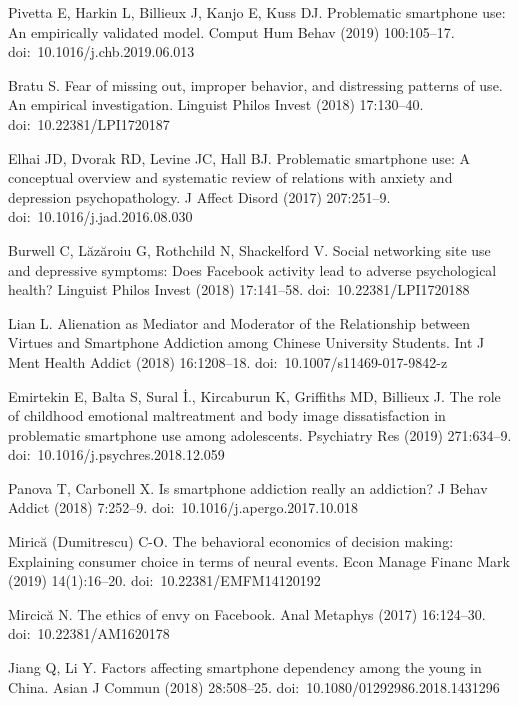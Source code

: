 \documentclass[a4paper]{article}
\begin{document}
\newpage
{}
\appendix

\begin{thebibliography}{10}

 Pivetta E, Harkin L, Billieux J, Kanjo E, Kuss DJ. 
Problematic smartphone use: An empirically validated model.
Comput Hum Behav (2019) 100:105–17. doi: 10.1016/j.chb.2019.06.013

 Bratu S. Fear of missing out, improper behavior,
and distressing patterns of use. An empirical investigation.
Linguist Philos Invest (2018) 17:130–40. doi: 10.22381/LPI1720187

 Elhai JD, Dvorak RD, Levine JC, Hall BJ.
Problematic smartphone use: A conceptual overview and systematic review
of relations with anxiety and depression psychopathology.
J Affect Disord (2017) 207:251–9. doi: 10.1016/j.jad.2016.08.030

  Burwell C, Lăzăroiu G, Rothchild N, Shackelford V.
Social networking site use and depressive symptoms:
Does Facebook activity lead to adverse psychological health?
Linguist Philos Invest (2018) 17:141–58. doi: 10.22381/LPI1720188

 Lian L. Alienation as Mediator and 
Moderator of the Relationship between Virtues and Smartphone Addiction among
Chinese University Students. Int J Ment Health Addict (2018) 16:1208–18. doi: 10.1007/s11469-017-9842-z

  Emirtekin E, Balta S, Sural İ., Kircaburun K,
Griffiths MD, Billieux J.
The role of childhood emotional maltreatment and body image dissatisfaction
in problematic smartphone use among adolescents.
Psychiatry Res (2019) 271:634–9. doi: 10.1016/j.psychres.2018.12.059

 Panova T, Carbonell X.
Is smartphone addiction really an addiction? J Behav Addict (2018)
7:252–9. doi: 10.1016/j.apergo.2017.10.018

  Mirică (Dumitrescu) C-O.
The behavioral economics of decision making: Explaining consumer
choice in terms of neural events.
Econ Manage Financ Mark (2019) 14(1):16–20. doi: 10.22381/EMFM14120192

 Mircică N. The ethics of envy on Facebook.
Anal Metaphys (2017) 16:124–30. doi: 10.22381/AM1620178

 Jiang Q, Li Y. Factors affecting
smartphone dependency among the young in China.
Asian J Commun (2018) 28:508–25. doi: 10.1080/01292986.2018.1431296
 
\end{thebibliography}	
\end{document}
